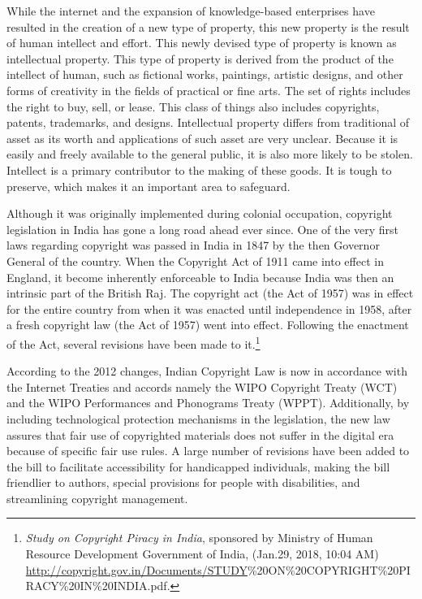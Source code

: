 \begin{multicols}{2}
\noi
While the internet and the expansion of knowledge-based enterprises have resulted in the
creation of a new type of property, this new property is the result of human intellect and
effort. This newly devised type of property is known as intellectual property. This type of
property is derived from the product of the intellect of human, such as fictional works,
paintings, artistic designs, and other forms of creativity in the fields of practical or fine arts.
The set of rights includes the right to buy, sell, or lease. This class of things also includes
copyrights, patents, trademarks, and designs. Intellectual property differs from traditional of
asset as its worth and applications of such asset are very unclear. Because it is easily and freely available to the general public, it is also more likely to be stolen. Intellect is a primary
contributor to the making of these goods. It is tough to preserve, which makes it an important
area to safeguard.

\vspace{.1cm}


\vspace{.1cm}

\noi
Although it was originally implemented during colonial occupation, copyright legislation in
India has gone a long road ahead ever since. One of the very first laws regarding copyright
was passed in India in 1847 by the then Governor General of the country. When the
Copyright Act of 1911 came into effect in England, it become inherently enforceable to India
because India was then an intrinsic part of the British Raj. The copyright act (the Act of
1957) was in effect for the entire country from when it was enacted until independence in
1958, after a fresh copyright law (the Act of 1957) went into effect. Following the enactment
of the Act, several revisions have been made to it.\footnote{\textit{Study on Copyright Piracy in India}, sponsored by Ministry of Human Resource Development Government of India, (Jan.29, 2018, 10:04 AM) \url{http://copyright.gov.in/Documents/STUDY}\%20ON\%20COPYRIGHT\%20PIRACY\%20IN\%20INDIA.pdf.}


\noi
According to the 2012 changes, Indian Copyright Law is now in accordance with the Internet
Treaties and accords namely the WIPO Copyright Treaty (WCT) and the WIPO
Performances and Phonograms Treaty (WPPT). Additionally, by including technological
protection mechanisms in the legislation, the new law assures that fair use of copyrighted
materials does not suffer in the digital era because of specific fair use rules. A large number
of revisions have been added to the bill to facilitate accessibility for handicapped individuals,
making the bill friendlier to authors, special provisions for people with disabilities, and
streamlining copyright management.


\end{multicols}
